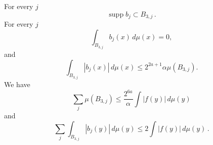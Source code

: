 \begin{lemma}
\begin{equation}
    \end{equation}
    For every $j$
    \begin{equation}
        \label{eq-supp-bj}
        \operatorname{supp} b_j \subset B_{3,j}\,.
    \end{equation}
    For every $j$
    \begin{equation}
        \label{eq-bad-mean-zero}
        \int_{B_{3,j}} b_j(x)\, d\mu(x)=0,
    \end{equation}
    and
     \begin{equation}
        \label{eq-bj-L1}
        \int_{B_{3,j}} |b_j(x)|\, d\mu(x) \leq 2^{2a+1} \alpha \mu(B_{3,j}).
    \end{equation}
    We have
    \begin{equation}
        \label{eq-bset-length-sum}
        \sum_j \mu(B_{3,j})\leq \frac{2^{6a}}{\alpha}\int |f(y)|\, d\mu(y)
    \end{equation}
    and
    \begin{equation}
    \label{eq-b-L1}
    \sum_{j}\int_{B_{3,j}} |b_j(y)|\, d\mu(y)\leq 2 \int |f(y)|\, d\mu(y)\,.
    \end{equation}
\end{lemma}

